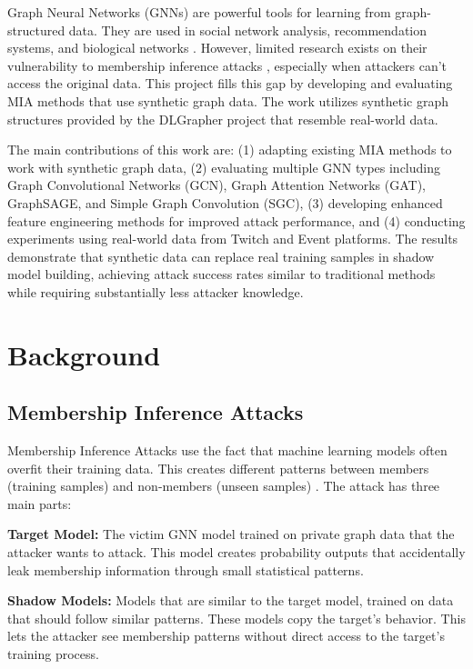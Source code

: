 \documentclass{article}
\begin{document}
Graph Neural Networks (GNNs) are powerful tools for learning from graph-structured data. They are used in social network analysis, recommendation systems, and biological networks \cite{kipf2017semi, velickovic2018graph, hamilton2017inductive}. However, limited research exists on their vulnerability to membership inference attacks \cite{he2021membership}, especially when attackers can't access the original data. This project fills this gap by developing and evaluating MIA methods that use synthetic graph data. The work utilizes synthetic graph structures provided by the DLGrapher project \cite{dlgrapher2022} that resemble real-world data.

The main contributions of this work are: (1) adapting existing MIA methods to work with synthetic graph data, (2) evaluating multiple GNN types including Graph Convolutional Networks (GCN), Graph Attention Networks (GAT), GraphSAGE, and Simple Graph Convolution (SGC), (3) developing enhanced feature engineering methods for improved attack performance, and (4) conducting experiments using real-world data from Twitch and Event platforms. The results demonstrate that synthetic data can replace real training samples in shadow model building, achieving attack success rates similar to traditional methods while requiring substantially less attacker knowledge.

\section{Background}
\subsection{Membership Inference Attacks}
Membership Inference Attacks use the fact that machine learning models often overfit their training data. This creates different patterns between members (training samples) and non-members (unseen samples) \cite{salem2019ml, nasr2019comprehensive}. The attack has three main parts:

\textbf{Target Model:} The victim GNN model trained on private graph data that the attacker wants to attack. This model creates probability outputs that accidentally leak membership information through small statistical patterns.

\textbf{Shadow Models:} Models that are similar to the target model, trained on data that should follow similar patterns. These models copy the target's behavior. This lets the attacker see membership patterns without direct access to the target's training process.
\end{document}
